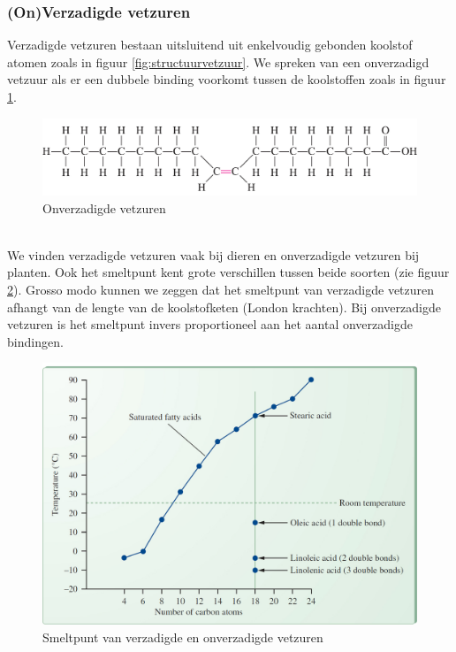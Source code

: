 \documentclass[a4paper,kul]{kulakarticle} %
\begin{document}
\subsubsection{(On)Verzadigde vetzuren}
Verzadigde vetzuren bestaan uitsluitend uit enkelvoudig gebonden koolstof atomen zoals in figuur \ref{fig:structuurvetzuur}. We spreken van een onverzadigd vetzuur als er een dubbele binding voorkomt tussen de koolstoffen zoals in figuur \ref{fig:onverzadigdevetzuren}.
\begin{figure}[h]
	\centering
	\includegraphics[width=0.7\linewidth]{OnVerzadigdeVetzuren}
	\caption[Onverzadigde VZ]{Onverzadigde vetzuren}
	\label{fig:onverzadigdevetzuren}
\end{figure}\\
We vinden verzadigde vetzuren vaak bij dieren en onverzadigde vetzuren bij planten. Ook het smeltpunt kent grote verschillen tussen beide soorten (zie figuur \ref{fig:smeltpuntvetzuren}). Grosso modo kunnen we zeggen dat het smeltpunt van verzadigde vetzuren afhangt van de lengte van de koolstofketen (London krachten). Bij onverzadigde vetzuren is het smeltpunt invers proportioneel aan het aantal onverzadigde bindingen. 
\begin{figure}[h]
	\centering
	\includegraphics[width=0.7\linewidth]{smeltpuntVetzuren}
	\caption[Smeltpunt]{Smeltpunt van verzadigde en onverzadigde vetzuren}
	\label{fig:smeltpuntvetzuren}
\end{figure}
\end{document}
